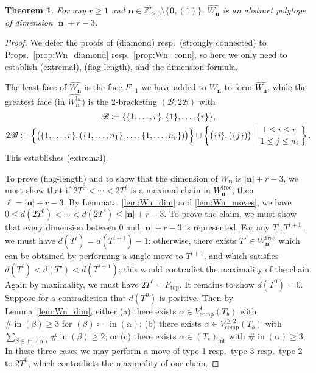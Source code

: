 \documentclass[11pt]{amsart}
\newtheorem{theorem}{Theorem}[section]
\theoremstyle{definition}
\theoremstyle{remark}
\theoremstyle{plain}
\newcommand{\bZ}{\mathbb{Z}}
\newcommand\bn{\mathbf{n}}
\newcommand\bzero{\mathbf{0}}
\newcommand{\sB}{\mathscr{B}}
\newcommand{\stB}{2\mathscr{B}}
\newcommand{\on}{\operatorname}
\newcommand{\comp}{C^2}
\renewcommand{\comp}{{\on{comp}}}
\newcommand{\incom}{\on{in}}
\newcommand{\inte}{{\on{int}}}
\newcommand{\tree}{{\on{tree}}}
\newcommand{\br}{{\on{br}}}
\renewcommand{\top}{{\on{top}}}
\newcommand{\wh}{\widehat}
\begin{document}
\begin{theorem}
\label{thm:Wn_polytope}
For any $r \geq 1$ and $\bn \in \bZ^r_{\geq0}\setminus\{\bzero,(1)\}$, $\wh{W_\bn}$ is an abstract polytope of dimension $|\bn| + r - 3$.	
\end{theorem}

\begin{proof}
We defer the proofs of {\sc(diamond)} resp.\ {\sc(strongly connected)} to Props.\ \ref{prop:Wn_diamond} resp.\ \ref{prop:Wn_conn}, so here we only need to establish {\sc(extremal)}, {\sc(flag-length)}, and the dimension formula.

The least face of $\wh{W_\bn}$ is the face $F_{-1}$ we have added to $W_\bn$ to form $\wh{W_\bn}$, while the greatest face (in $\wh{W_\bn^\br}$) is the 2-bracketing $(\sB, \stB)$ with
\begin{gather}
\sB \coloneqq \{\{1,\ldots,r\},\{1\},\ldots,\{r\}\},
\\
\stB \coloneqq \Bigl\{ \bigl(\{1,\ldots,r\},(\{1,\ldots,n_1\},\ldots,\{1,\ldots,n_r\})\bigr)\Bigr\}
\cup
\left\{\bigl(\{i\},(\{j\})\bigr) \:\left|\:
{{1\leq i\leq r}
\atop
{1\leq j\leq n_i}}
\right.\right\}.
\nonumber
\end{gather}
This establishes {\sc(extremal)}.

To prove {\sc(flag-length)} and to show that the dimension of $W_\bn$ is $|\bn|+r-3$, we must show that if $2T^0 < \cdots < 2T^\ell$ is a maximal chain in $W_\bn^\tree$, then $\ell = |\bn| + r - 3$.
By Lemmata~\ref{lem:Wn_dim} and \ref{lem:Wn_moves}, we have $0 \leq d(2T^0) < \cdots < d(2T^\ell) \leq |\bn|+r-3$.
To prove the claim, we must show that every dimension between 0 and $|\bn|+r-3$ is represented.
For any $T^i, T^{i+1}$, we must have $d(T^i) = d(T^{i+1}) - 1$: otherwise, there exists $T' \in W_\bn^\tree$ which can be obtained by performing a single move to $T^{i+1}$, and which satisfies $d(T^i) < d(T') < d(T^{i+1})$; this would contradict the maximality of the chain.
Again by maximality, we must have $2T^\ell = F_\top$.
It remains to show $d(T^0) = 0$.
Suppose for a contradiction that $d(T^0)$ is positive.
Then by Lemma~\ref{lem:Wn_dim}, either (a) there exists $\alpha \in V_\comp^1(T_b)$ with $\#\!\incom(\beta) \geq 3$ for $(\beta) \coloneqq \incom(\alpha)$; (b) there exists $\alpha \in V_\comp^{\geq2}(T_b)$ with $\sum_{\beta \in \incom(\alpha)} \#\!\incom(\beta) \geq 2$; or (c) there exists $\alpha \in (T_s)_\inte$ with $\#\!\incom(\alpha) \geq 3$.
In these three cases we may perform a move of type 1 resp.\ type 3 resp.\ type 2 to $2T^0$, which contradicts the maximality of our chain.
\end{proof}
\end{document}
